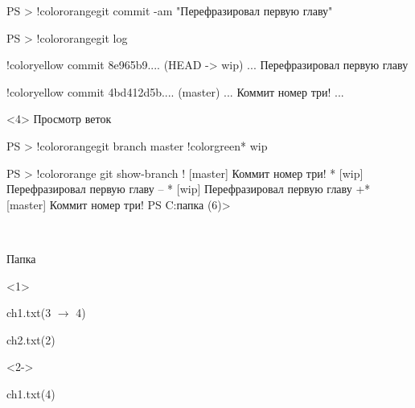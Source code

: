 \documentclass[9pt, aspectratio=1610]{beamer}
\begin{document}
\begin{frame}[t,fragile]
\begin{columns}[onlytextwidth]
\begin{column}[T]{\linewidth}
\begin{minipage}[t][5.2cm][t]{\textwidth}
\begin{onlyenv}
\begin{VerbatimCmd}[gobble=6]
						PS > !color{orange}git commit -am "Перефразировал первую главу"
						
						PS > !color{orange}git log
						
						!color{yellow} commit 8e965b9.... (HEAD -> wip)
						...						
						Перефразировал первую главу
						
						!color{yellow} commit 4bd412d5b.... (master)
						...						
						Коммит номер три!
						...
						
					\end{VerbatimCmd}
					
				\end{onlyenv}
				
				\begin{onlyenv}<4>
					Просмотр веток
					
					\begin{VerbatimCmd}[gobble=5]
						
						PS > !color{orange}git branch
						master
						!color{green}* wip
						 
					\end{VerbatimCmd}
					
					\begin{VerbatimCmd}[gobble=5]
						
						PS > !color{orange} git show-branch
						! [master] Коммит номер три!
						* [wip] Перефразировал первую главу
						--
						* [wip] Перефразировал первую главу
						+* [master] Коммит номер три!
						PS C:\Users\gavre\Desktop{} папка (6)> 
						
					\end{VerbatimCmd}
					
				\end{onlyenv}
				

				
			\end{minipage}\\
			\begin{minipage}[t][3cm][t]{\linewidth}
				\begin{minipage}[t]{0.29\linewidth}
					\begin{exampleblock}{Папка\strut}  %
						
						\begin{onlyenv}<1>
							\strut ch1.txt(3 $\to$ 4)
							
							\strut ch2.txt(2)
						\end{onlyenv}
						
						\begin{onlyenv}<2->
							\strut ch1.txt(4)\rememb{a1}
							

\end{onlyenv}
\end{exampleblock}
\end{minipage}
\end{minipage}
\end{column}
\end{columns}
\end{frame}
\end{document}
